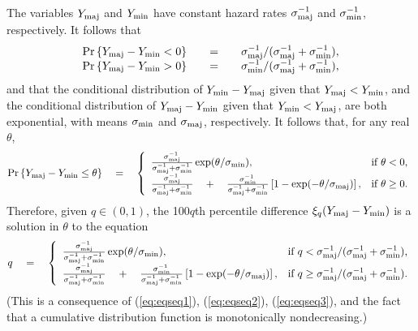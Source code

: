 \documentclass[a4paper]{article}      %
\begin{document}
The variables $Y_{\rm maj}$ and $Y_{\rm min}$ have constant hazard rates $\sigma_{\rm maj}^{-1}$ and $\sigma_{\rm min}^{-1}$, respectively.
It follows that
\begin{equation}
\begin{array}{rcl}
{\rm Pr} \left\{ Y_{\rm maj} - Y_{\rm min} < 0 \right\} &\quad = \quad& \sigma_{\rm maj}^{-1} / ( \sigma_{\rm maj}^{-1} + \sigma_{\rm min}^{-1} ) , \\
{\rm Pr} \left\{ Y_{\rm maj} - Y_{\rm min} > 0 \right\} &\quad = \quad& \sigma_{\rm min}^{-1} / ( \sigma_{\rm maj}^{-1} + \sigma_{\rm min}^{-1} ) ,
\end{array}
\label{eq:eqseq2}
\end{equation}
and that the conditional distribution of $Y_{\rm min} - Y_{\rm maj}$ given that $Y_{\rm maj} < Y_{\rm min}$,
and the conditional distribution of $Y_{\rm maj} - Y_{\rm min}$ given that $Y_{\rm min} < Y_{\rm maj}$,
are both exponential, with means $\sigma_{\rm min}$ and $\sigma_{\rm maj}$, respectively.
It follows that, for any real $\theta$,
\begin{equation}
{\rm Pr} \left\{ Y_{\rm maj} - Y_{\rm min} \le \theta \right\} \quad = \quad \left\{
\begin{array}{ll}
{ \sigma_{\rm maj}^{-1} \over {\sigma_{\rm maj}^{-1} + \sigma_{\rm min}^{-1}} } \exp ( \theta/\sigma_{\rm min} ),
  & \mbox{if $\theta < 0$,} \\
{ \sigma_{\rm maj}^{-1} \over {\sigma_{\rm maj}^{-1} + \sigma_{\rm min}^{-1}} } \quad + \quad { \sigma_{\rm min}^{-1} \over {\sigma_{\rm maj}^{-1} + \sigma_{\rm min}^{-1}} } \left[ 1 - \exp (- \theta/\sigma_{\rm maj}) \right] ,
  & \mbox{if $\theta \ge 0$.}
\end{array}
\right.
\label{eq:eqseq3}
\end{equation}
Therefore, given $q \in (0,1)$, the 100$q$th percentile difference $\xi_q ( Y_{\rm maj} - Y_{\rm min} )$ is a solution in $\theta$ to the equation
\begin{equation}
q \quad = \quad \left\{
\begin{array}{ll}
{ \sigma_{\rm maj}^{-1} \over {\sigma_{\rm maj}^{-1} + \sigma_{\rm min}^{-1}} } \exp ( \theta/\sigma_{\rm min} ),
  & \mbox{if $q < \sigma_{\rm maj}^{-1}/(\sigma_{\rm maj}^{-1} + \sigma_{\rm min}^{-1})$,} \\
{ \sigma_{\rm maj}^{-1} \over {\sigma_{\rm maj}^{-1} + \sigma_{\rm min}^{-1}} } \quad + \quad { \sigma_{\rm min}^{-1} \over {\sigma_{\rm maj}^{-1} + \sigma_{\rm min}^{-1}} } \left[ 1 - \exp (- \theta/\sigma_{\rm maj}) \right] ,
  & \mbox{if $q \ge \sigma_{\rm maj}^{-1}/(\sigma_{\rm maj}^{-1} + \sigma_{\rm min}^{-1})$.}
\end{array}
\right.
\label{eq:eqseq4}
\end{equation}
(This is a consequence of (\ref{eq:eqseq1}), (\ref{eq:eqseq2}), (\ref{eq:eqseq3}),
and the fact that a cumulative distribution function is monotonically nondecreasing.)
\end{document}
